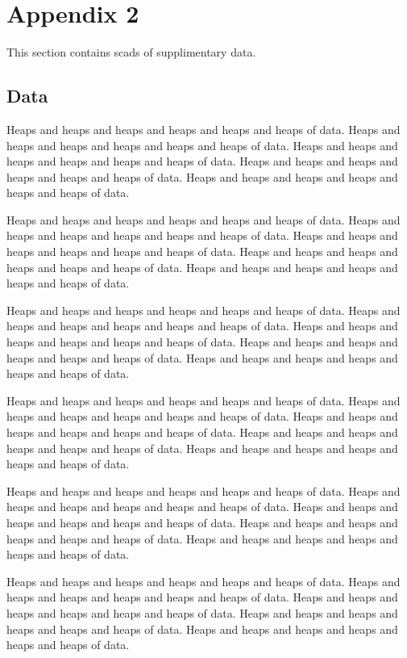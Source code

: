 \chapter{Appendix 2}\label{app2}

This section contains scads of supplimentary data.

\section{Data}

Heaps and heaps and heaps and heaps and heaps and heaps of data.
Heaps and heaps and heaps and heaps and heaps and heaps of data.
Heaps and heaps and heaps and heaps and heaps and heaps of data.
Heaps and heaps and heaps and heaps and heaps and heaps of data.
Heaps and heaps and heaps and heaps and heaps and heaps of data.

Heaps and heaps and heaps and heaps and heaps and heaps of data.
Heaps and heaps and heaps and heaps and heaps and heaps of data.
Heaps and heaps and heaps and heaps and heaps and heaps of data.
Heaps and heaps and heaps and heaps and heaps and heaps of data.
Heaps and heaps and heaps and heaps and heaps and heaps of data.

Heaps and heaps and heaps and heaps and heaps and heaps of data.
Heaps and heaps and heaps and heaps and heaps and heaps of data.
Heaps and heaps and heaps and heaps and heaps and heaps of data.
Heaps and heaps and heaps and heaps and heaps and heaps of data.
Heaps and heaps and heaps and heaps and heaps and heaps of data.

Heaps and heaps and heaps and heaps and heaps and heaps of data.
Heaps and heaps and heaps and heaps and heaps and heaps of data.
Heaps and heaps and heaps and heaps and heaps and heaps of data.
Heaps and heaps and heaps and heaps and heaps and heaps of data.
Heaps and heaps and heaps and heaps and heaps and heaps of data.

Heaps and heaps and heaps and heaps and heaps and heaps of data.
Heaps and heaps and heaps and heaps and heaps and heaps of data.
Heaps and heaps and heaps and heaps and heaps and heaps of data.
Heaps and heaps and heaps and heaps and heaps and heaps of data.
Heaps and heaps and heaps and heaps and heaps and heaps of data.

Heaps and heaps and heaps and heaps and heaps and heaps of data.
Heaps and heaps and heaps and heaps and heaps and heaps of data.
Heaps and heaps and heaps and heaps and heaps and heaps of data.
Heaps and heaps and heaps and heaps and heaps and heaps of data.
Heaps and heaps and heaps and heaps and heaps and heaps of data.

